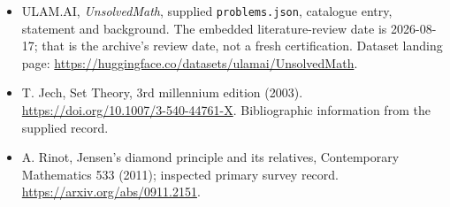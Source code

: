 \documentclass[11pt,a4paper]{article}
\begin{document}
{\small

\begin{itemize}

\item[\hypertarget{source:statement:1}{S1}] ULAM.AI, \emph{UnsolvedMath}, supplied \texttt{problems.json}, catalogue entry, statement and background. The embedded literature-review date is 2026-08-17; that is the archive’s review date, not a fresh certification. Dataset landing page: \url{https://huggingface.co/datasets/ulamai/UnsolvedMath}.

\item[\hypertarget{source:statement:2}{S2}] T. Jech, Set Theory, 3rd millennium edition (2003). \url{https://doi.org/10.1007/3-540-44761-X}. Bibliographic information from the supplied record.

\item[R1] A. Rinot, Jensen’s diamond principle and its relatives, Contemporary Mathematics 533 (2011); inspected primary survey record.
\url{https://arxiv.org/abs/0911.2151}.
\end{itemize}

}

\label{end:statement}
\end{document}
